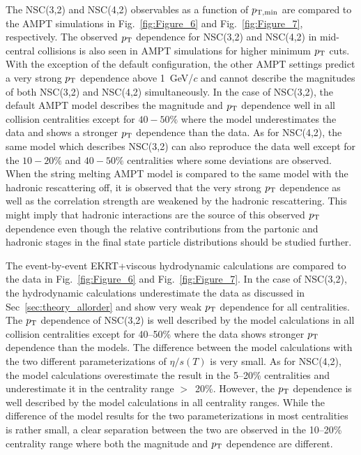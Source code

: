 The NSC(3,2) and NSC(4,2) observables as a function of $p_{\rm T, min}$ are compared to the {AMPT} simulations in Fig.~\ref{fig:Figure_6} and Fig.~\ref{fig:Figure_7}, respectively.
The observed $p_{\rm T}$ dependence for NSC(3,2) and NSC(4,2) in mid-central collisions is also seen in AMPT simulations for higher minimum $p_{\rm T}$ cuts.
With the exception of the default configuration, the other AMPT settings predict a very strong $p_{\rm T}$ dependence above 1~GeV/$c$ and cannot describe the magnitudes of both NSC(3,2) and NSC(4,2) simultaneously.
In the case of NSC(3,2), the default AMPT model describes the magnitude and $p_{\rm T}$ dependence well in all collision centralities except for $40-50\%$ where the model underestimates the data and shows a stronger $p_{\rm T}$ dependence than the data.
As for  NSC(4,2), the same model which describes NSC(3,2) can also reproduce the data well except for the $10-20\%$ and $40-50\%$ centralities where some deviations are observed.
When the string melting AMPT model is compared to the same model with the hadronic rescattering off, it is observed that the very strong $p_{\rm T}$ dependence as well as the correlation strength are weakened by the hadronic rescattering.
This might imply that hadronic interactions are the source of this observed $p_{\rm T}$ dependence even though the relative contributions from the partonic and hadronic stages in the final state particle distributions should be studied further.

The event-by-event EKRT+viscous hydrodynamic calculations are compared to the data in Fig.~\ref{fig:Figure_6} and Fig.~\ref{fig:Figure_7}.
In the case of NSC(3,2), the hydrodynamic calculations underestimate the data as discussed in Sec~\ref{sec:theory_allorder} and show very weak $p_{\rm T}$ dependence for all centralities.
The $p_{\rm T}$ dependence of NSC(3,2) is well described by the model calculations in all collision centralities except for 40--50\% where the data shows stronger $p_{\rm T}$ dependence than the models. The difference between the model calculations with the two different parameterizations of $\eta/s(T)$ is very small. 
As for NSC(4,2), the model calculations overestimate the result in the 5--20\% centralities and underestimate it in the centrality range $>$~20\%. However, the $p_{\rm T}$ dependence is well described by the model calculations in all centrality ranges. 
While the difference of the model results for the two parameterizations in most centralities is rather small, a clear separation between the two are observed in the 10--20\% centrality range where both the magnitude and $p_{\rm T}$ dependence are different.

